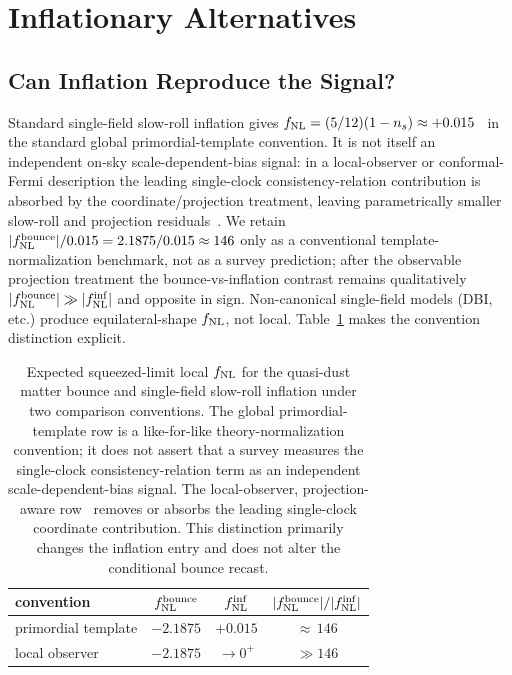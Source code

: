 \documentclass[aps,prd,twocolumn,superscriptaddress,showpacs,preprintnumbers,nofootinbib,longbibliography,floatfix]{revtex4-2}
\newcommand{\fnl}{f_{\rm NL}}
\begin{document}
\section{Inflationary Alternatives}
\label{sec:bayesian}

\subsection{Can Inflation Reproduce the Signal?}

Standard single-field slow-roll inflation gives $\fnl = (5/12)(1-n_s) \approx +0.015$~\cite{Maldacena:2002vr} in the standard global primordial-template convention. It is not itself an independent on-sky scale-dependent-bias signal: in a local-observer or conformal-Fermi description the leading single-clock consistency-relation contribution is absorbed by the coordinate/projection treatment, leaving parametrically smaller slow-roll and projection residuals~\cite{Pajer:2013,TanakaUrakawa:2011}. We retain $|\fnl^{\rm bounce}|/0.015 = 2.1875/0.015 \approx 146$ only as a conventional template-normalization benchmark, not as a survey prediction; after the observable projection treatment the bounce-vs-inflation contrast remains qualitatively $|\fnl^{\rm bounce}| \gg |\fnl^{\rm inf}|$ and opposite in sign. Non-canonical single-field models (DBI, etc.) produce equilateral-shape $\fnl$, not local. Table~\ref{tab:frames} makes the convention distinction explicit.
\begin{table}[h]
\centering
\caption{\label{tab:frames}Expected squeezed-limit local $\fnl$ for the quasi-dust matter bounce and single-field slow-roll inflation under two comparison conventions. The global primordial-template row is a like-for-like theory-normalization convention; it does not assert that a survey measures the single-clock consistency-relation term as an independent scale-dependent-bias signal. The local-observer, projection-aware row~\cite{Pajer:2013,TanakaUrakawa:2011} removes or absorbs the leading single-clock coordinate contribution. This distinction primarily changes the inflation entry and does not alter the conditional bounce recast.}
\begin{ruledtabular}
\begin{tabular}{lccc}
convention & $\fnl^{\rm bounce}$ & $\fnl^{\rm inf}$ & $|\fnl^{\rm bounce}|/|\fnl^{\rm inf}|$ \\ \hline
primordial template & $-2.1875$ & $+0.015$ & ${\approx}\,146$ \\
local observer & $-2.1875$ & $\to 0^{+}$ & $\gg 146$ \\
\end{tabular}
\end{ruledtabular}
\end{table}
\end{document}
